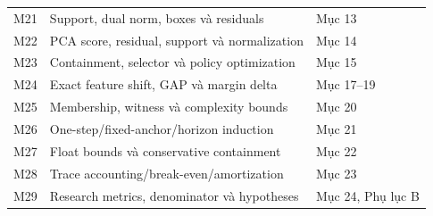 \documentclass[11pt,a4paper]{article}
\theoremstyle{definition}
\begin{document}
\begin{longtable}{@{}p{0.85cm}p{6.5cm}p{6.2cm}@{}}
M21 & Support, dual norm, boxes và residuals & Mục 13\\
M22 & PCA score, residual, support và normalization & Mục 14\\
M23 & Containment, selector và policy optimization & Mục 15\\
M24 & Exact feature shift, GAP và margin delta & Mục 17--19\\
M25 & Membership, witness và complexity bounds & Mục 20\\
M26 & One-step/fixed-anchor/horizon induction & Mục 21\\
M27 & Float bounds và conservative containment & Mục 22\\
M28 & Trace accounting/break-even/amortization & Mục 23\\
M29 & Research metrics, denominator và hypotheses & Mục 24, Phụ lục B\\\bottomrule
\end{longtable}
\end{document}

